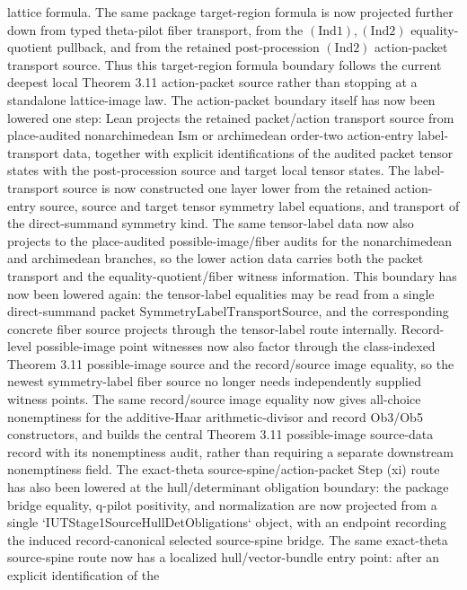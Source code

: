 \documentclass[11pt]{article}
\theoremstyle{plain}
\theoremstyle{definition}
\theoremstyle{remark}
\begin{document}
lattice formula.  The same package target-region formula is now projected
further down from typed theta-pilot fiber transport, from the
\((\mathrm{Ind}1),(\mathrm{Ind}2)\) equality-quotient pullback, and from the
retained post-procession \((\mathrm{Ind}2)\) action-packet transport source.
Thus this target-region formula boundary follows the current deepest local
Theorem 3.11 action-packet source rather than stopping at a standalone
lattice-image law.  The action-packet boundary itself has now been lowered
one step: Lean projects the retained packet/action transport source from
place-audited nonarchimedean \(\mathrm{Ism}\) or archimedean order-two
action-entry label-transport data, together with explicit identifications of
the audited packet tensor states with the post-procession source and target
local tensor states.  The label-transport source is now constructed one layer
lower from the retained action-entry source, source and target tensor symmetry
label equations, and transport of the direct-summand symmetry kind.  The same
tensor-label data now also projects to the place-audited possible-image/fiber
audits for the nonarchimedean and archimedean branches, so the lower action
data carries both the packet transport and the equality-quotient/fiber witness
information.  This boundary has now been lowered again: the tensor-label
equalities may be read from a single direct-summand packet
\(\mathrm{SymmetryLabelTransportSource}\), and the corresponding concrete fiber
source projects through the tensor-label route internally.  Record-level
possible-image point witnesses now also factor through the class-indexed
Theorem 3.11 possible-image source and the record/source image equality, so the
newest symmetry-label fiber source no longer needs independently supplied
witness points.  The same record/source image equality now gives all-choice
nonemptiness for the additive-Haar arithmetic-divisor and record Ob3/Ob5
constructors, and builds the central Theorem 3.11 possible-image source-data
record with its nonemptiness audit, rather than requiring a separate downstream
nonemptiness field.  The exact-theta source-spine/action-packet Step (xi)
route has also been lowered at the hull/determinant obligation boundary: the
package bridge equality, q-pilot positivity, and normalization are now
projected from a single `IUTStage1SourceHullDetObligations` object, with an
endpoint recording the induced record-canonical selected source-spine bridge.
The same exact-theta source-spine route now has a localized
hull/vector-bundle entry point: after an explicit identification of the
\end{document}
